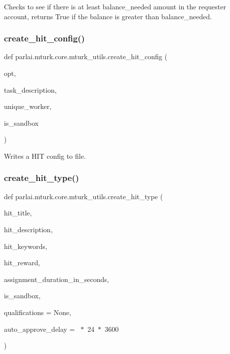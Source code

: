 \begin{DoxyVerb}Checks to see if there is at least balance_needed amount in the requester account,
returns True if the balance is greater than balance_needed.
\end{DoxyVerb}
 \mbox{\label{namespaceparlai_1_1mturk_1_1core_1_1mturk__utils_a3f54e0bc76066fc3a784d6b2e3fc13bb}} 
\subsubsection{\texorpdfstring{create\+\_\+hit\+\_\+config()}{create\_hit\_config()}}
{\footnotesize\ttfamily def parlai.\+mturk.\+core.\+mturk\+\_\+utils.\+create\+\_\+hit\+\_\+config (\begin{DoxyParamCaption}\item[{}]{opt,  }\item[{}]{task\+\_\+description,  }\item[{}]{unique\+\_\+worker,  }\item[{}]{is\+\_\+sandbox }\end{DoxyParamCaption})}

\begin{DoxyVerb}Writes a HIT config to file.
\end{DoxyVerb}
 \mbox{\label{namespaceparlai_1_1mturk_1_1core_1_1mturk__utils_a2812666cca37ae0fa15e1843d3a87cd4}} 
\subsubsection{\texorpdfstring{create\+\_\+hit\+\_\+type()}{create\_hit\_type()}}
{\footnotesize\ttfamily def parlai.\+mturk.\+core.\+mturk\+\_\+utils.\+create\+\_\+hit\+\_\+type (\begin{DoxyParamCaption}\item[{}]{hit\+\_\+title,  }\item[{}]{hit\+\_\+description,  }\item[{}]{hit\+\_\+keywords,  }\item[{}]{hit\+\_\+reward,  }\item[{}]{assignment\+\_\+duration\+\_\+in\+\_\+seconds,  }\item[{}]{is\+\_\+sandbox,  }\item[{}]{qualifications = {\ttfamily None},  }\item[{}]{auto\+\_\+approve\+\_\+delay = {~$\ast$~24~$\ast$~3600} }\end{DoxyParamCaption})}


